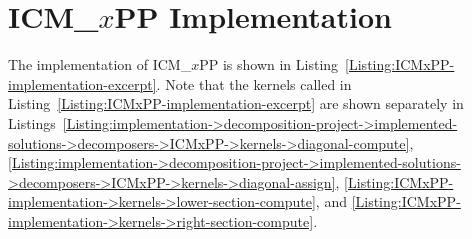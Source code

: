 \chapter{ICM\_$x$PP Implementation}\label{Appendix:ICMxPP-implementation}
The implementation of ICM\_$x$PP is shown in Listing~\ref{Listing:ICMxPP-implementation-excerpt}.
Note that the kernels called in Listing~\ref{Listing:ICMxPP-implementation-excerpt} are shown separately in Listings~\ref{Listing:implementation->decomposition-project->implemented-solutions->decomposers->ICMxPP->kernels->diagonal-compute}, \ref{Listing:implementation->decomposition-project->implemented-solutions->decomposers->ICMxPP->kernels->diagonal-assign}, \ref{Listing:ICMxPP-implementation->kernels->lower-section-compute}, and \ref{Listing:ICMxPP-implementation->kernels->right-section-compute}.

